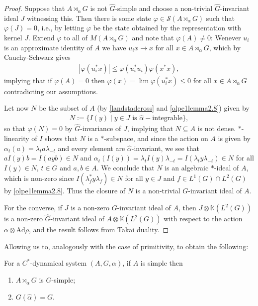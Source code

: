 \begin{proof}
	Suppose that $A \rtimes_\alpha G$ is not $\hat G$-simple and choose a non-trivial $\hat G$-invariant ideal $J$ witnessing this. Then there is some state $\varphi \in \mathcal{S}(A \rtimes_\alpha G)$ such that $\varphi(J) = 0$, i.e., by letting $\varphi$ be the state obtained by the representation with kernel $J$. Extend $\varphi$ to all of $M(A \rtimes_\alpha G)$ and note that $\varphi(A) \neq 0$: Wenever $u_i$ is an approximate identity of $A$ we have $u_i x \to x$ for all $x \in A \rtimes_\alpha G$, which by Cauchy-Schwarz gives
	\begin{align*}
	|\varphi(u_i^* x)| \leq \varphi(u_i^*u_i)\varphi(x^*x),
	\end{align*}
	implying that if $\varphi(A) = 0$ then $\varphi(x) = \lim \varphi(u_i^* x) \leq 0$ for all $x \in A \rtimes_\alpha G$ contradicting our assumptions.
	
	Let now $N$ be the subset of $A$ (by \cref{landstadcross} and \cref{olpe1lemma2.8}) given by
	\begin{align*}
		N:=\{ I(y) \mid y \in J \text{ is } \hat \alpha-\text{integrable}\},
	\end{align*}
	so that $\varphi(N) = 0$ by $\hat G$-invariance of $J$, implying that $N \subseteq A$ is not dense. $*$-linearity of $I$ shows that $N$ is a $*$-subspace, and since the action on $A$ is given by $\alpha_t(a) = \lambda_t a \lambda_{-t}$ and every element are $\hat \alpha$-invariant, we see that $a I(y) b = I(ayb) \in N$ and $\alpha_t(I(y)) = \lambda_t I(y) \lambda_{-t} = I(\lambda_t y \lambda_{-t}) \in N$ for all $I(y)\in N$, $t \in G$ and $a,b \in A$. We conclude that $N$ is an algebraic $*$-ideal of $A$, which is non-zero since $I(\lambda_f^* y \lambda_f) \in N$ for all $y \in J$ and $f \in L^1(G) \cap L^2(G)$ by \cref{olpe1lemma2.8}. Thus the closure of $N$ is a non-trivial $G$-invariant ideal of $A$.

	For the converse, if $J$ is a non-zero $G$-invariant ideal of $A$, then $J \otimes \mathbb{K}(L^2(G))$ is a non-zero $\hat G$-invariant ideal of $A \otimes \mathbb{K}(L^2(G))$ with respect to the action $\alpha \otimes \mathrm{Ad} \rho$, and the result follows from Takai duality.
\end{proof}
Allowing us to, analogously with the case of primitivity, to obtain the following:
\begin{proposition}	
	For a $C^*$-dynamical system $(A,G,\alpha)$, if $A$ is simple then
\begin{enumerate}
	\item $A \rtimes_\alpha G$ is $\hat G$-simple;
	\item $G(\hat \alpha) = G$.
\end{enumerate}
\end{proposition}
